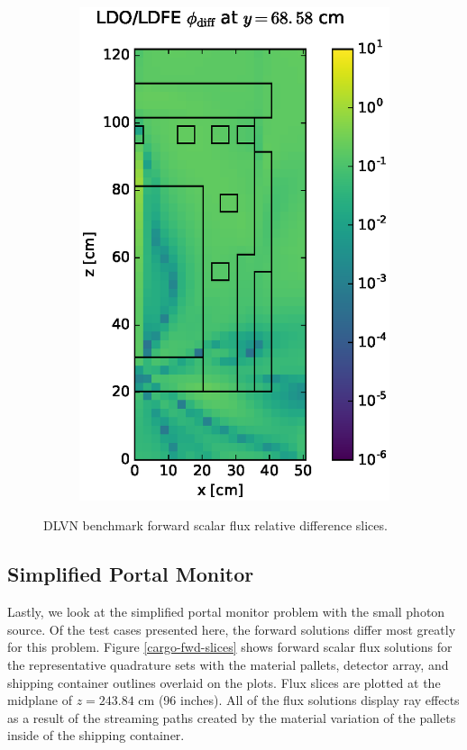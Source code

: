 \documentclass{article} %
\begin{document}
\begin{figure}[!hbt]
\begin{subfigure}{0.4\textwidth}
\includegraphics[max height=0.445\textheight]
{img/dlvn-flux-diff-ldfe.eps}
\end{subfigure}
\caption{DLVN benchmark forward scalar flux relative difference slices.}
\label{dlvn-fwd-diff-rel}
\end{figure}

\FloatBarrier
\subsection{Simplified Portal Monitor}

Lastly, we look at the simplified portal monitor problem with the small photon
source. Of the test cases presented here, the forward solutions differ most
greatly for this problem. Figure \ref{cargo-fwd-slices} shows forward scalar
flux solutions for the representative quadrature sets with the material
pallets, detector array, and shipping container outlines overlaid on the plots.
Flux slices are plotted at the midplane of $z = 243.84$ cm (96 inches). All of
the flux solutions display ray effects as a result of the streaming paths
created by the material variation of the pallets inside of the shipping
container.
\end{document}
